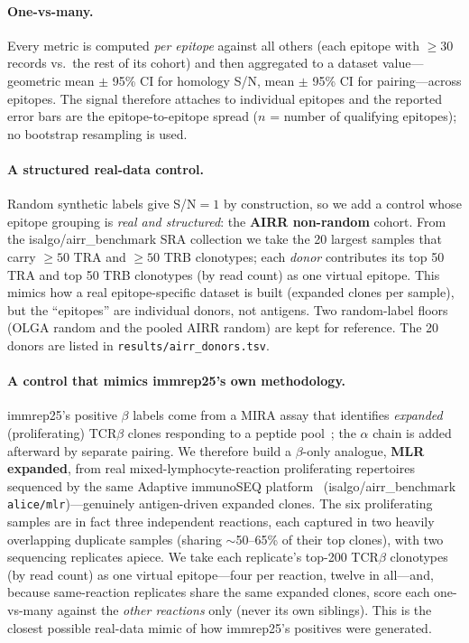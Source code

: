 \paragraph{One-vs-many.} Every metric is computed \emph{per epitope} against all
others (each epitope with $\ge 30$ records vs.\ the rest of its cohort) and then
aggregated to a dataset value---geometric mean $\pm$ 95\% CI for homology S/N, mean
$\pm$ 95\% CI for pairing---across epitopes. The signal therefore attaches to
individual epitopes and the reported error bars are the epitope-to-epitope spread
($n$ = number of qualifying epitopes); no bootstrap resampling is used.

\paragraph{A structured real-data control.} Random synthetic labels give S/N${=}1$ by
construction, so we add a control whose epitope grouping is \emph{real and structured}:
the \textbf{AIRR non-random} cohort. From the isalgo/airr\_benchmark SRA collection we
take the 20 largest samples that carry $\ge 50$ TRA and $\ge 50$ TRB clonotypes; each
\emph{donor} contributes its top 50 TRA and top 50 TRB clonotypes (by read count) as one
virtual epitope. This mimics how a real epitope-specific dataset is built (expanded
clones per sample), but the ``epitopes'' are individual donors, not antigens. Two
random-label floors (OLGA random and the pooled AIRR random) are kept for reference. The
20 donors are listed in \texttt{results/airr\_donors.tsv}.

\paragraph{A control that mimics immrep25's own methodology.} immrep25's positive
$\beta$ labels come from a MIRA assay that identifies \emph{expanded} (proliferating)
TCR$\beta$ clones responding to a peptide pool~\cite{Richardson2026}; the $\alpha$ chain
is added afterward by separate pairing. We therefore build a $\beta$-only analogue,
\textbf{MLR expanded}, from real mixed-lymphocyte-reaction proliferating repertoires
sequenced by the same Adaptive immunoSEQ platform~\cite{Emerson_2014}
(isalgo/airr\_benchmark \texttt{alice/mlr})---genuinely antigen-driven expanded clones.
The six proliferating samples are in fact three independent reactions, each captured in
two heavily overlapping duplicate samples (sharing $\sim$50--65\% of their top clones),
with two sequencing replicates apiece. We take each replicate's top-200 TCR$\beta$
clonotypes (by read count) as one virtual epitope---four per reaction, twelve in
all---and, because same-reaction replicates share the same expanded clones, score each
one-vs-many against the \emph{other reactions} only (never its own siblings). This is the
closest possible real-data mimic of how immrep25's positives were generated.

